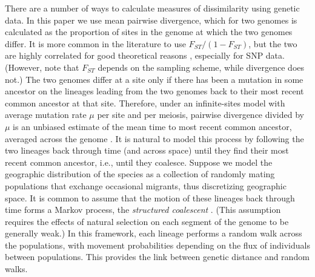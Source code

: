 \documentclass{article}
\begin{document}
There are a number of ways to calculate measures of dissimilarity using genetic data.
In this paper we use mean pairwise divergence, 
which for two genomes is calculated as the proportion of sites in the genome
at which the two genomes differ. 
It is more common in the literature to use $F_{ST}/(1-F_{ST})$, 
but the two are highly correlated for good theoretical reasons 
\citep{slatkin1991inbreeding,rousset1997genetic},
especially for SNP data.
(However, note that $F_{ST}$ depends on the sampling scheme, while divergence does not.) 
The two genomes differ at a site only if there has been a mutation in some ancestor on the lineages leading
from the two genomes back to their most recent common ancestor at that site.
Therefore,
under an infinite-sites model with average mutation rate $\mu$ per site and per meiosis,
pairwise divergence divided by $\mu$
is an unbiased estimate of the mean time to most recent common ancestor,
averaged across the genome \citep{hudson2007variance,ralph2015empirical}.
It is natural to model this process by following the two lineages back through time
(and across space)
until they find their most recent common ancestor,
i.e., until they coalesce.
Suppose we model the geographic distribution of the species
as a collection of randomly mating populations
that exchange occasional migrants,
thus discretizing geographic space.
It is common to assume that
the motion of these lineages back through time
forms a Markov process, the \emph{structured coalescent} \citep{wakeley2005coalescent}.
(This assumption requires the effects of natural selection on each segment of the genome 
to be generally weak.) 
In this framework, each lineage performs a random walk across the populations,
with movement probabilities depending on the flux of individuals between populations.
This provides the link between genetic distance and random walks.
\end{document}
